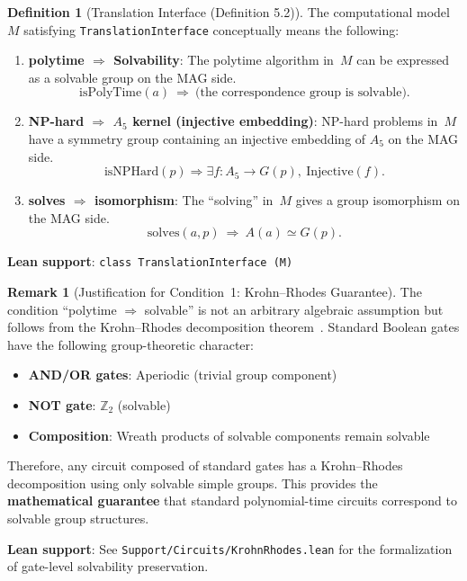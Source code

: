 \documentclass[11pt,a4paper]{article}
\theoremstyle{plain}
\theoremstyle{definition}
\newtheorem{definition}[theorem]{Definition}
\newtheorem{remark}[theorem]{Remark}
\newcommand{\Aalt}{A_5}
\newcommand{\isPolyTime}{\mathrm{isPolyTime}}
\newcommand{\isNPHard}{\mathrm{isNPHard}}
\newcommand{\TranslationInterface}{\texttt{TranslationInterface}}
\newcommand{\lean}[1]{\texttt{#1}}
\begin{document}
\begin{definition}[Translation Interface (Definition 5.2)]
The computational model~$M$ satisfying \TranslationInterface{} conceptually means the following:
\begin{enumerate}[nosep]
\item \textbf{polytime $\Rightarrow$ Solvability}: The polytime algorithm in~$M$ can be expressed as a solvable group on the MAG side.
\[
\isPolyTime(a)\ \Rightarrow\ \text{(the correspondence group is solvable)}.
\]
\item \textbf{NP-hard $\Rightarrow$ $\Aalt$ kernel (injective embedding)}: NP-hard problems in~$M$ have a symmetry group containing an injective embedding of $\Aalt$ on the MAG side.
\[
\isNPHard(p) \Rightarrow \exists f: \Aalt \to G(p),\ \text{Injective}(f).
\]
\item \textbf{solves $\Rightarrow$ isomorphism}: The ``solving'' in~$M$ gives a group isomorphism on the MAG side.
\[
\mathrm{solves}(a,p)\ \Rightarrow\ A(a) \simeq G(p).
\]
\end{enumerate}
\textbf{Lean support}: \lean{class TranslationInterface (M)}
\end{definition}

\begin{remark}[Justification for Condition~1: Krohn--Rhodes Guarantee]\label{rem:kr-condition1}
The condition ``polytime $\Rightarrow$ solvable'' is not an arbitrary algebraic assumption but follows from the Krohn--Rhodes decomposition theorem~\cite{krohnrhodes1965}. Standard Boolean gates have the following group-theoretic character:
\begin{itemize}[nosep]
\item \textbf{AND/OR gates}: Aperiodic (trivial group component)
\item \textbf{NOT gate}: $\mathbb{Z}_2$ (solvable)
\item \textbf{Composition}: Wreath products of solvable components remain solvable
\end{itemize}

Therefore, any circuit composed of standard gates has a Krohn--Rhodes decomposition using only solvable simple groups. This provides the \textbf{mathematical guarantee} that standard polynomial-time circuits correspond to solvable group structures.

\textbf{Lean support}: See \lean{Support/Circuits/KrohnRhodes.lean} for the formalization of gate-level solvability preservation.
\end{remark}
\end{document}
